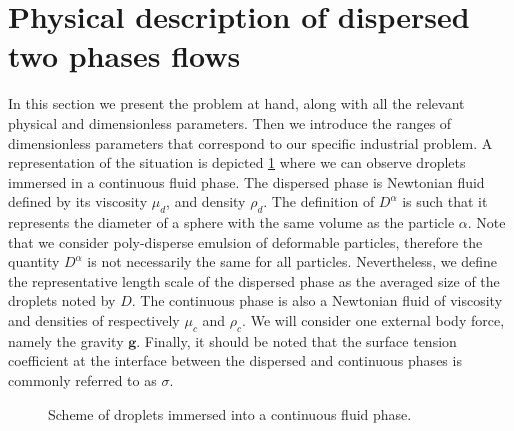 \section{Physical description of dispersed two phases flows}

In this section we present the problem at hand, along with all the relevant physical and dimensionless parameters.
Then we introduce the ranges of dimensionless parameters that correspond to our specific industrial problem. 
A representation of the situation is depicted \ref{fig:scheme} where we can observe droplets immersed in a continuous fluid phase.
The dispersed phase is Newtonian fluid defined by its viscosity $\mu_d$, and density $\rho_d$. 
The definition of $D^\alpha$ is such that it represents the diameter of a sphere with the same volume as the particle $\alpha$.
Note that we consider poly-disperse emulsion of deformable particles, therefore the quantity $D^\alpha$ is not necessarily the same for all particles.   
Nevertheless, we define the representative length scale of the dispersed phase as the averaged size of the droplets noted by $D$. 
The continuous phase is also a Newtonian fluid of viscosity and densities of respectively $\mu_c$ and $\rho_c$.  
We will consider one external body force, namely the gravity $\textbf{g}$. 
Finally, it should be noted that the surface tension coefficient at the interface between the dispersed and continuous phases is commonly referred to as $\sigma$.
\begin{figure}[h!]
    \centering
    \caption{Scheme of droplets immersed into a continuous fluid phase.}
    \label{fig:scheme}
\end{figure}

